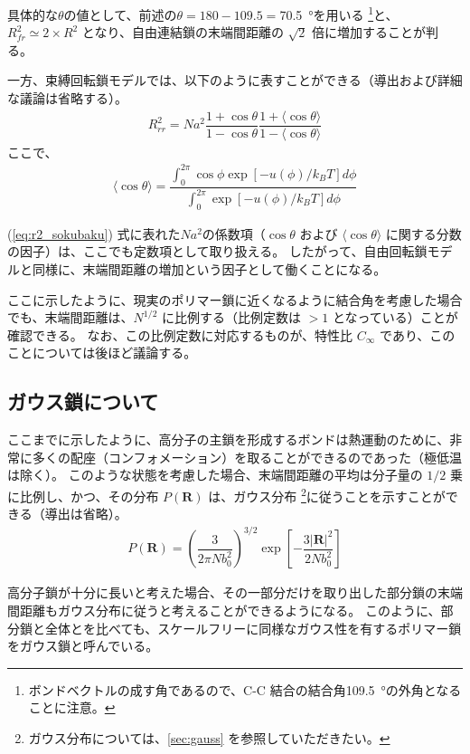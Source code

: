 \documentclass[a4paper,11pt]{jlreq}
\begin{document}
具体的な$\theta$の値として、前述の$\theta = 180-109.5=$\qty{70.5}{\degree}を用いる
\footnote
{
ボンドベクトルの成す角であるので、C-C 結合の結合角\qty{109.5}{\degree}の外角となることに注意。
}と、$R_{fr}^2 \simeq 2 \times R^2$ となり、自由連結鎖の末端間距離の $\sqrt{2}$ 倍に増加することが判る。


一方、束縛回転鎖モデルでは、以下のように表すことができる（導出および詳細な議論は省略する）。
\begin{align}
R_{rr}^2 = Na^2 \dfrac{1+\cos \theta}{1-\cos \theta} \dfrac{1+ \langle \cos \theta \rangle}{1- \langle \cos \theta \rangle}
\label{eq:r2_sokubaku}
\end{align}
ここで、
\begin{align}
\langle \cos \theta \rangle = \dfrac{\displaystyle \int_0^{2 \pi} \cos \phi \exp [-u(\phi)/k_B T] d \phi}{\displaystyle \int_0^{2\pi} \exp [-u(\phi)/k_B T] d \phi}
\end{align}

(\ref{eq:r2_sokubaku}) 式に表れた$Na^2$の係数項（$\cos \theta$ および $\langle \cos \theta \rangle$ に関する分数の因子）は、ここでも定数項として取り扱える。
したがって、自由回転鎖モデルと同様に、末端間距離の増加という因子として働くことになる。

ここに示したように、現実のポリマー鎖に近くなるように結合角を考慮した場合でも、末端間距離は、$N^{1/2}$ に比例する（比例定数は $> 1$ となっている）ことが確認できる。
なお、この比例定数に対応するものが、特性比 $C_{\infty}$ であり、このことについては後ほど議論する。

\subsection{ガウス鎖について}

ここまでに示したように、高分子の主鎖を形成するボンドは熱運動のために、非常に多くの配座（コンフォメーション）を取ることができるのであった（極低温は除く）。
このような状態を考慮した場合、末端間距離の平均は分子量の $1/2$ 乗に比例し、かつ、その分布 $P(\bm{R})$ は、ガウス分布
\footnote
{
ガウス分布については、\ref{sec:gauss} を参照していただきたい。
}に従うことを示すことができる（導出は省略）。
\begin{align}
P(\bm{R}) =\left( \dfrac{3}{2 \pi N b_0^2} \right)^{3/2} \exp \left[ -\dfrac{3|\bm{R}|^2}{2Nb_0^2} \right]
\end{align}

高分子鎖が十分に長いと考えた場合、その一部分だけを取り出した部分鎖の末端間距離もガウス分布に従うと考えることができるようになる。
このように、部分鎖と全体とを比べても、スケールフリーに同様なガウス性を有するポリマー鎖をガウス鎖と呼んでいる。
\end{document}
